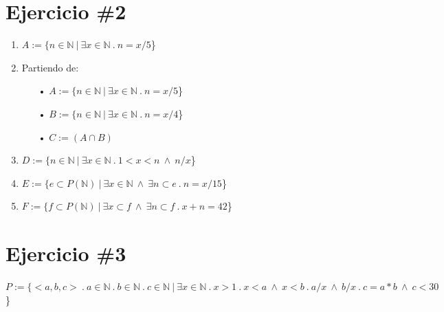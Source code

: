 \documentclass[11pt,letterpaper]{article}
\begin{document}
\section{Ejercicio \#2}
\begin{enumerate}
\item{$A:=\{n \in \mathbb{N}\ |\ \exists x \in \mathbb{N}\ .\ n=x/5 $\}}

\item Partiendo de:
\begin{itemize}
\item[•] $A:=\{n \in \mathbb{N}\ |\ \exists x \in \mathbb{N}\ .\ n=x/5 $\}
\item[•] $B:=\{n \in \mathbb{N}\ |\ \exists x \in \mathbb{N}\ .\ n=x/4 $\} \\

\item[•]$C:=(A \cap B)$
\end{itemize}

\item{$D:=\{n \in \mathbb{N}\ |\ \exists x \in \mathbb{N}\ .\ 1<x<n\ \wedge\ n/x$\}}

\item{{$E:=\{e \subset P(\mathbb{N})\ |\ \exists x \in \mathbb{N}\ \wedge\ \exists n \subset e\ .\ n=x/15$\}}}

\item{{$F:=\{f \subset P(\mathbb{N})\ |\ \exists x \subset f\ \wedge\ \exists n \subset f\ .\ x+n=42$\}}}
\end{enumerate}


\section{Ejercicio \#3}
$P:=\{<a,b,c>\ .\ a \in \mathbb{N}\ .\ b \in \mathbb{N}\ .\ c \in \mathbb{N}\ |\ \exists x \in \mathbb{N}\ .\ x>1\ .\ x<a\ \wedge\ x<b\ .\ a/x\ \wedge\ b/x\ .\ c=a*b\ \wedge\ c<30$\}
\end{document}
